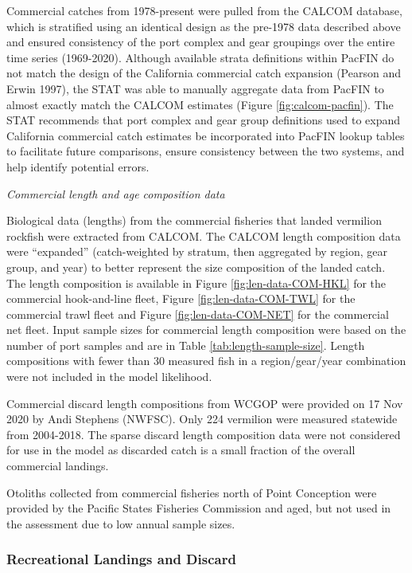 \documentclass[
  english,
  a4paper,
]{article}
\begin{document}
Commercial catches from 1978-present were pulled from the CALCOM database, which
is stratified using an identical design as the pre-1978 data described above and
ensured consistency of the port complex and gear groupings over the entire time
series (1969-2020). Although available strata definitions within PacFIN do not
match the design of the California commercial catch expansion (Pearson and Erwin 1997),
the STAT was able to manually aggregate data from PacFIN to almost exactly match
the CALCOM estimates (Figure \ref{fig:calcom-pacfin}). The STAT recommends that
port complex and gear group definitions used to expand California commercial
catch estimates be incorporated into PacFIN lookup tables to facilitate future
comparisons, ensure consistency between the two systems, and help identify potential errors.

\emph{Commercial length and age composition data}

Biological data (lengths) from the commercial fisheries that landed vermilion rockfish were
extracted from CALCOM. The CALCOM length composition data were ``expanded''
(catch-weighted by stratum, then aggregated by region, gear group, and year) to
better represent the size composition of the landed catch. The length composition
is available in Figure \ref{fig:len-data-COM-HKL}
for the commercial hook-and-line fleet, Figure \ref{fig:len-data-COM-TWL} for the commercial trawl fleet and Figure \ref{fig:len-data-COM-NET} for the commercial net fleet. Input sample sizes for
commercial length composition were based on the number of port samples and are in
Table \ref{tab:length-sample-size}. Length compositions with fewer than 30
measured fish in a region/gear/year combination were not included in the model
likelihood.

Commercial discard length compositions from WCGOP were provided on
17 Nov 2020 by Andi Stephens (NWFSC). Only 224 vermilion were measured statewide from
2004-2018. The sparse discard length composition data were not considered for use in the
model as discarded catch is a small fraction of the overall commercial landings.

Otoliths collected from commercial fisheries north of Point Conception were provided by
the Pacific States Fisheries Commission and aged, but not used in the assessment due
to low annual sample sizes.

\hypertarget{recreational-landings-and-discard}{%
\subsubsection{Recreational Landings and Discard}\label{recreational-landings-and-discard}}
\end{document}
